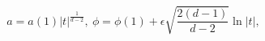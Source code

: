 \begin{equation}
a=a(1)\vert t\vert ^{\frac{1}{d-2}},\ \phi=\phi (1)+ \epsilon
\sqrt{\frac{2(d-1)}{d-2}}\ln \vert t \vert, \label{sol}
\end{equation}

